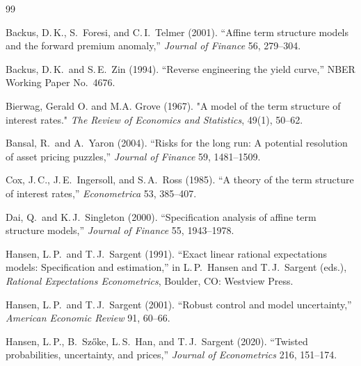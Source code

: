 \documentclass[12pt]{article}
\theoremstyle{definition}
\begin{document}
\begin{thebibliography}{99}

Backus, D.\,K., S.\ Foresi, and C.\,I.\ Telmer (2001).
``Affine term structure models and the forward premium anomaly,''
\textit{Journal of Finance} 56, 279--304.

Backus, D.\,K.\ and S.\,E.\ Zin (1994).
``Reverse engineering the yield curve,''
NBER Working Paper No.\ 4676.

Bierwag, Gerald O. and M.A. Grove (1967). "A model of the term structure of interest rates." \textit{The Review of Economics and Statistics}, 49(1), 50--62.

Bansal, R.\ and A.\ Yaron (2004).
``Risks for the long run: A potential resolution of asset pricing puzzles,''
\textit{Journal of Finance} 59, 1481--1509.

Cox, J.\,C., J.\,E.\ Ingersoll, and S.\,A.\ Ross (1985).
``A theory of the term structure of interest rates,''
\textit{Econometrica} 53, 385--407.

Dai, Q.\ and K.\,J.\ Singleton (2000).
``Specification analysis of affine term structure models,''
\textit{Journal of Finance} 55, 1943--1978.

Hansen, L.\,P.\ and T.\,J.\ Sargent (1991).
``Exact linear rational expectations models: Specification and
estimation,''
in L.\,P.\ Hansen and T.\,J.\ Sargent (eds.),
\textit{Rational Expectations Econometrics},
Boulder, CO: Westview Press.
%

Hansen, L.\,P.\ and T.\,J.\ Sargent (2001).
``Robust control and model uncertainty,''
\textit{American Economic Review} 91, 60--66.

Hansen, L.\,P., B.\ Sz\H{o}ke, L.\,S.\ Han, and T.\,J.\ Sargent (2020).
``Twisted probabilities, uncertainty, and prices,''
\textit{Journal of Econometrics} 216, 151--174.


\end{thebibliography}
\end{document}
